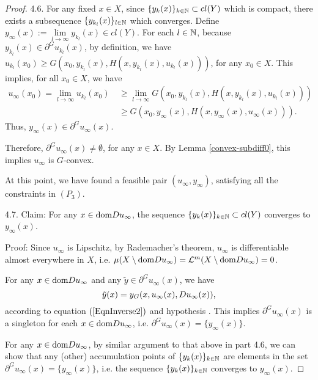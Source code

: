 \begin{proof}
	4.6. For any fixed $x\in X$, since $\{y_k(x)\}_{k \in \mathbb{N}} \subset cl(Y)$ which is compact, there exists a subsequence $\{y_{k_l}(x)\}_{l\in \mathbb{N}}$ which converges. Define $y_{\infty}(x):= \lim\limits_{l\rightarrow \infty} y_{k_l}(x) \in cl(Y)$.
	For each $l\in \mathbb{N}$, because  $y_{k_l}(x)\in \partial^G u_{k_l} (x)$, by definition, we have $u_{k_l}(x_0)\ge G(x_0, y_{k_l}(x), H(x, y_{k_l}(x), u_{k_l}(x)))$, for any $x_0\in X$. This implies, for all $x_0\in X$, we have
		\begin{equation*}
		\begin{split}
			u_{\infty}(x_0) = \lim\limits_{l \rightarrow \infty} u_{k_l}(x_0) &~\ge \lim_{l\rightarrow \infty}  G(x_0, y_{k_l}(x), H(x, y_{k_l}(x), u_{k_l}(x)))\\
			&~\ge G(x_0, y_{\infty}(x), H(x, y_{\infty}(x), u_{\infty}(x))).
		\end{split}
		\end{equation*} 
	Thus, $y_{\infty}(x) \in \partial^G u_{\infty}(x)$. 
											
	Therefore, $\partial^G u_{\infty}(x) \ne \emptyset$, for any $x\in X$. By Lemma \ref{convex-subdiff0}, this implies $u_{\infty}$ is $G$-convex.
											
	At this point, we have found a feasible pair $(u_{\infty}, y_{\infty})$, satisfying all the constraints in $(P_3)$.\medskip
											
	4.7. Claim: For any $x\in {\mathop{\rm dom}} Du_{\infty}$, the sequence $\{y_k(x)\}_{k\in \mathbb{N}} \subset cl(Y)$ converges to $y_{\infty}(x)$.
											
		Proof: Since $u_{\infty}$ is Lipschitz, by Rademacher's theorem, $u_{\infty}$ is differentiable almost everywhere in $X$, i.e. $\mu(X\setminus {\mathop{\rm dom}} Du_{\infty}) = \mathcal{L}^m(X\setminus {\mathop{\rm dom}} Du_{\infty}) =0$.
											
		For any $x\in {\mathop{\rm dom}} Du_{\infty}$ and any $\tilde{y}\in \partial^G u_{\infty}(x)$, we have 
			\begin{equation*}
				\tilde{y}(x) = y_G(x, u_{\infty}(x), Du_{\infty}(x)),
			\end{equation*}
		according to equation $(\ref{EqnInverse2})$ and hypothesis \Gone. This implies $ \partial^G u_{\infty}(x)$ is a singleton for each $x\in {\mathop{\rm dom}} Du_{\infty}$, i.e. $\partial^G u_{\infty}(x) =\{y_{\infty}(x)\}$.
											
		For any $x\in {\mathop{\rm dom}} Du_{\infty}$, by similar argument to that above in part 4.6, we can show that any (other) accumulation points of $\{y_k(x)\}_{k\in \mathbb{N}}$ are elements in the set $\partial^G u_{\infty}(x)=\{y_{\infty}(x)\}$, i.e. the sequence $\{y_k(x)\}_{k\in \mathbb{N}}$ converges to $y_{\infty}(x)$.\medskip
											

\end{proof}
